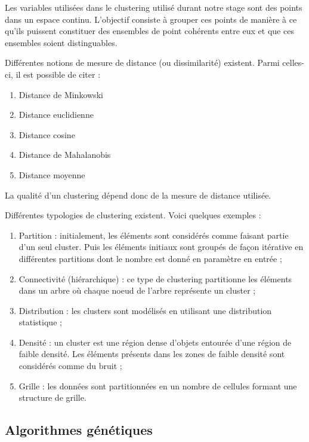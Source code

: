 \documentclass{llncs}
\begin{document}
Les variables utilisées dans le clustering utilisé durant notre stage sont des points dans un espace continu.
L'objectif consiste à grouper ces points de manière à ce qu'ils puissent constituer des ensembles de point cohérents entre eux et que ces ensembles soient distinguables.

Différentes notions de mesure de distance (ou dissimilarité) existent. Parmi celles-ci, il est possible de citer :

\begin{enumerate}
  \item Distance de Minkowski
  \item Distance euclidienne
  \item Distance cosine
  \item Distance de Mahalanobis
  \item Distance moyenne
\end{enumerate}

La qualité d'un clustering dépend donc de la mesure de distance utilisée.

Différentes typologies de clustering existent. Voici quelques exemples : 

\begin{enumerate}
  \item Partition : initialement, les éléments sont considérés comme faisant partie d'un seul cluster. Puis les éléments initiaux sont groupés de façon itérative en différentes partitions dont le nombre est donné en paramètre en entrée ;
  \item Connectivité (hiérarchique) : ce type de clustering partitionne les éléments dans un arbre où chaque noeud de l'arbre représente un cluster ;
  \item Distribution : les clusters sont modélisés en utilisant une distribution statistique ;
  \item Densité : un cluster est une région dense d'objets entourée d'une région de faible densité. Les éléments présents dans les zones de faible densité sont considérés comme du bruit ;
  \item Grille : les données sont partitionnées en un nombre de cellules formant une structure de grille.
\end{enumerate}



\subsection{Algorithmes génétiques}
 
\end{document}
